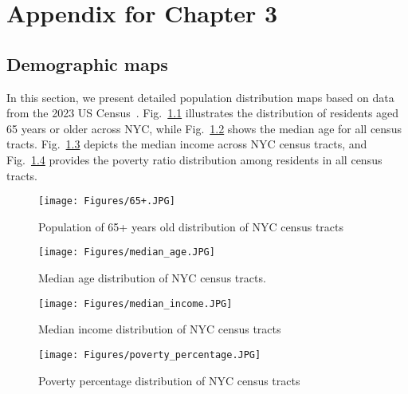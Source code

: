 \chapter{Appendix for Chapter 3}
\section{Demographic maps}\label{appendix_access}
In this section, we present detailed population distribution maps based on data from the 2023 US Census~\cite{bureau2023census}. Fig.~\ref{fig:65+_distribution} illustrates the distribution of residents aged 65 years or older across NYC, while Fig.~\ref{fig:median_age_distribution} shows the median age for all census tracts. Fig.~\ref{fig:median_income_distribution} depicts the median income across NYC census tracts, and Fig.~\ref{fig:poverty_percentage_distribution} provides the poverty ratio distribution among residents in all census tracts.
 

\begin{figure}[ht]
    \centering
    \texttt{[image: Figures/65+.JPG]} 
    \caption{Population of 65+ years old distribution of NYC census tracts}
    \label{fig:65+_distribution}
\end{figure}
\begin{figure}[ht]
    \centering
    \texttt{[image: Figures/median\_age.JPG]} 
    \caption{Median age distribution of NYC census tracts.}
    \label{fig:median_age_distribution}
\end{figure}
\begin{figure}[ht]
    \centering
    \texttt{[image: Figures/median\_income.JPG]} 
    \caption{Median income distribution of NYC census tracts}
    \label{fig:median_income_distribution}
\end{figure}
\begin{figure}[ht]
    \centering
    \texttt{[image: Figures/poverty\_percentage.JPG]} 
    \caption{Poverty percentage distribution of NYC census tracts}
\label{fig:poverty_percentage_distribution}
\end{figure}

